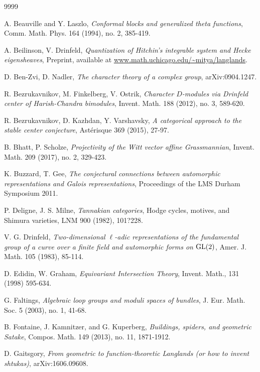 \begin{thebibliography}{9999}

A. Beauville and Y. Laszlo, \emph{Conformal blocks and generalized theta functions}, Comm. Math. Phys. 164 (1994), no. 2, 385-419.

A. Beilinson, V. Drinfeld, \emph{Quantization of Hitchin's integrable system and Hecke eigensheaves}, Preprint, available at \url{www.math.uchicago.edu/~mitya/langlands}.

D. Ben-Zvi, D. Nadler, \emph{The character theory of a complex group}, arXiv:0904.1247.

R. Bezrukavnikov, M. Finkelberg, V. Ostrik, \emph{Character $D$-modules via Drinfeld center of Harish-Chandra bimodules}, Invent. Math. 188 (2012), no. 3, 589-620.

R. Bezrukavnikov, D. Kazhdan, Y. Varshavsky, \emph{A categorical approach to the stable center conjecture}, Ast\'erisque 369 (2015), 27-97.

B. Bhatt, P. Scholze, \emph{Projectivity of the Witt vector affine Grassmannian}, Invent. Math. 209 (2017), no. 2, 329-423.

K. Buzzard, T. Gee, \emph{The conjectural connections between automorphic representations and Galois representations}, Proceedings of the LMS Durham Symposium 2011.

P. Deligne, J. S. Milne, \emph{Tannakian categories}, Hodge cycles, motives, and Shimura varieties, LNM 900 (1982), 101?228.

V. G. Drinfeld, \emph{Two-dimensional $\ell$-adic representations of the fundamental group of a curve over a finite field and automorphic forms on ${\operatorname{GL}}(2)$}, Amer. J. Math. 105 (1983), 85-114.

D. Edidin, W. Graham, \emph{Equivariant Intersection Theory}, Invent. Math., 131 (1998) 595-634.

G. Faltings, \emph{Algebraic loop groups and moduli spaces of bundles}, J. Eur. Math. Soc. 5 (2003), no. 1, 41-68.

B. Fontaine, J. Kamnitzer, and G. Kuperberg, \emph{Buildings, spiders, and geometric Satake}, Compos. Math. 149 (2013), no. 11, 1871-1912.

D. Gaitsgory, \emph{From geometric to function-theoretic Langlands (or how to invent shtukas)}, arXiv:1606.09608.


\end{thebibliography}
